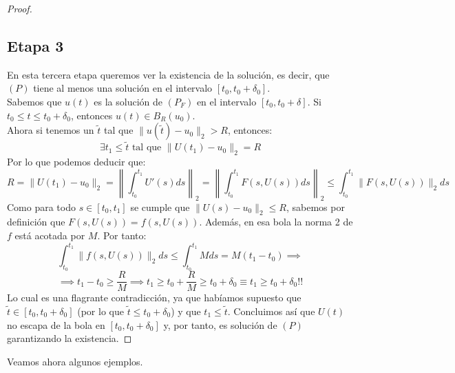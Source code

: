 \begin{proof}
\begin{center}
    \end{center}

    \subsection*{Etapa 3}
    En esta tercera etapa queremos ver la existencia de la solución, es decir, que $(P)$ tiene al menos una solución en el intervalo $[t_0, t_0 + \delta_0]$.\\

    Sabemos que $u(t)$ es la solución de $(P_F)$ en el intervalo $[t_0, t_0 + \delta]$. Si $t_0 \leq t \leq t_0 + \delta_0$, entonces $u(t) \in B_R(u_0)$.\\

    Ahora si tenemos un $\widetilde{t}$ tal que $\| u(\widetilde{t}) - u_0 \|_2 > R$, entonces:
    \[
        \exists t_1 \leq \widetilde{t} \text{ tal que } 
        \| U(t_1) - u_0 \|_2 = R 
    \]
    Por lo que podemos deducir que:
    \[
        R = \| U(t_1) - u_0 \|_2 =
        \left\| \int_{t_0}^{t_1} U'(s) ds \right\|_2 =
        \left\| \int_{t_0}^{t_1} F(s, U(s)) ds \right\|_2 \leq
        \int_{t_0}^{t_1} \| F(s, U(s)) \|_2 ds 
    \]
    Como para todo $s \in [t_0, t_1]$ se cumple que $\| U(s) - u_0 \|_2 \leq R$, sabemos por definición que $F(s, U(s)) = f(s, U(s))$. Además, en esa bola la norma 2 de $f$ está acotada por $M$. Por tanto:
    \[
        \int_{t_0}^{t_1} \| f(s, U(s)) \|_2 ds \leq
        \int_{t_0}^{t_1} M ds = M (t_1 - t_0) \implies
    \]
    \[
        \implies
        t_1 - t_0 \geq \frac{R}{M} \implies
        t_1 \geq t_0 + \frac{R}{M} \geq t_0 + \delta_0 \equiv
        \boxed{t_1 \geq t_0 + \delta_0 !!}
    \]
    Lo cual es una flagrante contradicción, ya que habíamos supuesto que $\widetilde{t} \in [t_0, t_0 + \delta_0]$ (por lo que $\widetilde{t} \leq t_0 + \delta_0$) y que $t_1 \leq \widetilde{t}$. Concluimos así que $U(t)$ no escapa de la bola en $[t_0, t_0 + \delta_0]$ y, por tanto, es solución de $(P)$ garantizando la existencia.
    

\end{proof}

Veamos ahora algunos ejemplos.

